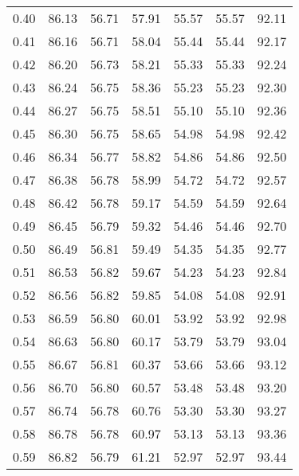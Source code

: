\begin{tabular}{|c|c|c|c|c|c|c|}
      0.40 &     86.13 &     56.71 &      57.91 &   55.57 &      55.57 &         92.11 \\
      0.41 &     86.16 &     56.71 &      58.04 &   55.44 &      55.44 &         92.17 \\
      0.42 &     86.20 &     56.73 &      58.21 &   55.33 &      55.33 &         92.24 \\
      0.43 &     86.24 &     56.75 &      58.36 &   55.23 &      55.23 &         92.30 \\
      0.44 &     86.27 &     56.75 &      58.51 &   55.10 &      55.10 &         92.36 \\
      0.45 &     86.30 &     56.75 &      58.65 &   54.98 &      54.98 &         92.42 \\
      0.46 &     86.34 &     56.77 &      58.82 &   54.86 &      54.86 &         92.50 \\
      0.47 &     86.38 &     56.78 &      58.99 &   54.72 &      54.72 &         92.57 \\
      0.48 &     86.42 &     56.78 &      59.17 &   54.59 &      54.59 &         92.64 \\
      0.49 &     86.45 &     56.79 &      59.32 &   54.46 &      54.46 &         92.70 \\
      0.50 &     86.49 &     56.81 &      59.49 &   54.35 &      54.35 &         92.77 \\
      0.51 &     86.53 &     56.82 &      59.67 &   54.23 &      54.23 &         92.84 \\
      0.52 &     86.56 &     56.82 &      59.85 &   54.08 &      54.08 &         92.91 \\
      0.53 &     86.59 &     56.80 &      60.01 &   53.92 &      53.92 &         92.98 \\
      0.54 &     86.63 &     56.80 &      60.17 &   53.79 &      53.79 &         93.04 \\
      0.55 &     86.67 &     56.81 &      60.37 &   53.66 &      53.66 &         93.12 \\
      0.56 &     86.70 &     56.80 &      60.57 &   53.48 &      53.48 &         93.20 \\
      0.57 &     86.74 &     56.78 &      60.76 &   53.30 &      53.30 &         93.27 \\
      0.58 &     86.78 &     56.78 &      60.97 &   53.13 &      53.13 &         93.36 \\
      0.59 &     86.82 &     56.79 &      61.21 &   52.97 &      52.97 &         93.44 \\

\end{tabular}
